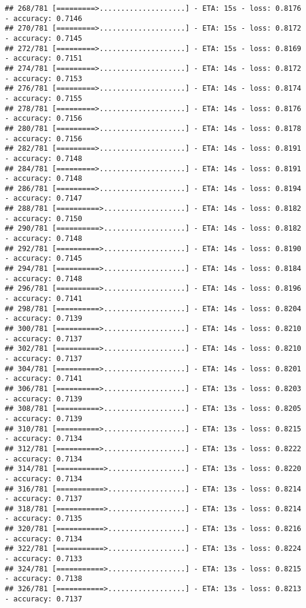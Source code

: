 \documentclass[
]{article}
\begin{document}
\begin{verbatim}
## 268/781 [=========>....................] - ETA: 15s - loss: 0.8176 - accuracy: 0.7146
## 270/781 [=========>....................] - ETA: 15s - loss: 0.8172 - accuracy: 0.7145
## 272/781 [=========>....................] - ETA: 15s - loss: 0.8169 - accuracy: 0.7151
## 274/781 [=========>....................] - ETA: 14s - loss: 0.8172 - accuracy: 0.7153
## 276/781 [=========>....................] - ETA: 14s - loss: 0.8174 - accuracy: 0.7155
## 278/781 [=========>....................] - ETA: 14s - loss: 0.8176 - accuracy: 0.7156
## 280/781 [=========>....................] - ETA: 14s - loss: 0.8178 - accuracy: 0.7156
## 282/781 [=========>....................] - ETA: 14s - loss: 0.8191 - accuracy: 0.7148
## 284/781 [=========>....................] - ETA: 14s - loss: 0.8191 - accuracy: 0.7148
## 286/781 [=========>....................] - ETA: 14s - loss: 0.8194 - accuracy: 0.7147
## 288/781 [==========>...................] - ETA: 14s - loss: 0.8182 - accuracy: 0.7150
## 290/781 [==========>...................] - ETA: 14s - loss: 0.8182 - accuracy: 0.7148
## 292/781 [==========>...................] - ETA: 14s - loss: 0.8190 - accuracy: 0.7145
## 294/781 [==========>...................] - ETA: 14s - loss: 0.8184 - accuracy: 0.7148
## 296/781 [==========>...................] - ETA: 14s - loss: 0.8196 - accuracy: 0.7141
## 298/781 [==========>...................] - ETA: 14s - loss: 0.8204 - accuracy: 0.7139
## 300/781 [==========>...................] - ETA: 14s - loss: 0.8210 - accuracy: 0.7137
## 302/781 [==========>...................] - ETA: 14s - loss: 0.8210 - accuracy: 0.7137
## 304/781 [==========>...................] - ETA: 14s - loss: 0.8201 - accuracy: 0.7141
## 306/781 [==========>...................] - ETA: 13s - loss: 0.8203 - accuracy: 0.7139
## 308/781 [==========>...................] - ETA: 13s - loss: 0.8205 - accuracy: 0.7139
## 310/781 [==========>...................] - ETA: 13s - loss: 0.8215 - accuracy: 0.7134
## 312/781 [==========>...................] - ETA: 13s - loss: 0.8222 - accuracy: 0.7134
## 314/781 [===========>..................] - ETA: 13s - loss: 0.8220 - accuracy: 0.7134
## 316/781 [===========>..................] - ETA: 13s - loss: 0.8214 - accuracy: 0.7137
## 318/781 [===========>..................] - ETA: 13s - loss: 0.8214 - accuracy: 0.7135
## 320/781 [===========>..................] - ETA: 13s - loss: 0.8216 - accuracy: 0.7134
## 322/781 [===========>..................] - ETA: 13s - loss: 0.8224 - accuracy: 0.7133
## 324/781 [===========>..................] - ETA: 13s - loss: 0.8215 - accuracy: 0.7138
## 326/781 [===========>..................] - ETA: 13s - loss: 0.8213 - accuracy: 0.7137

\end{verbatim}
\end{document}
